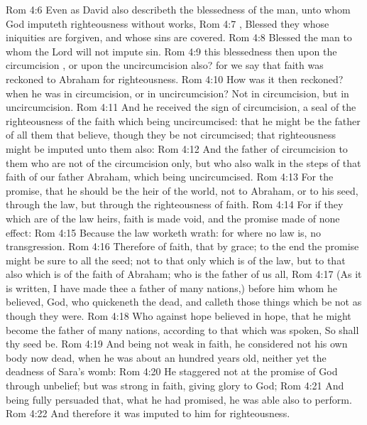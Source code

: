 \vs Rom 4:6 Even as David also describeth the blessedness of the man, unto whom God imputeth righteousness without works,
\vs Rom 4:7 , Blessed  they whose iniquities are forgiven, and whose sins are covered.
\vs Rom 4:8 Blessed  the man to whom the Lord will not impute sin.
\vs Rom 4:9  this blessedness then upon the circumcision , or upon the uncircumcision also? for we say that faith was reckoned to Abraham for righteousness.
\vs Rom 4:10 How was it then reckoned? when he was in circumcision, or in uncircumcision? Not in circumcision, but in uncircumcision.
\vs Rom 4:11 And he received the sign of circumcision, a seal of the righteousness of the faith which  being uncircumcised: that he might be the father of all them that believe, though they be not circumcised; that righteousness might be imputed unto them also:
\vs Rom 4:12 And the father of circumcision to them who are not of the circumcision only, but who also walk in the steps of that faith of our father Abraham, which  being  uncircumcised.
\vs Rom 4:13 For the promise, that he should be the heir of the world,  not to Abraham, or to his seed, through the law, but through the righteousness of faith.
\vs Rom 4:14 For if they which are of the law  heirs, faith is made void, and the promise made of none effect:
\vs Rom 4:15 Because the law worketh wrath: for where no law is,  no transgression.
\vs Rom 4:16 Therefore  of faith, that  by grace; to the end the promise might be sure to all the seed; not to that only which is of the law, but to that also which is of the faith of Abraham; who is the father of us all,
\vs Rom 4:17 (As it is written, I have made thee a father of many nations,) before him whom he believed,  God, who quickeneth the dead, and calleth those things which be not as though they were.
\vs Rom 4:18 Who against hope believed in hope, that he might become the father of many nations, according to that which was spoken, So shall thy seed be.
\vs Rom 4:19 And being not weak in faith, he considered not his own body now dead, when he was about an hundred years old, neither yet the deadness of Sara's womb:
\vs Rom 4:20 He staggered not at the promise of God through unbelief; but was strong in faith, giving glory to God;
\vs Rom 4:21 And being fully persuaded that, what he had promised, he was able also to perform.
\vs Rom 4:22 And therefore it was imputed to him for righteousness.
